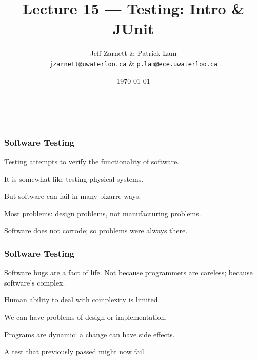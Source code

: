 
\usepackage{alltt}

\title{Lecture 15 --- Testing: Intro \& JUnit}

\author{Jeff Zarnett \& Patrick Lam \\ \small \texttt{jzarnett@uwaterloo.ca} \& \texttt{p.lam@ece.uwaterloo.ca}}
\date{\today}



\begin{frame}
  \titlepage

  \vfill
  \begin{center}
    \\
                  {\tiny\CcNote{\CcLongnameByNcSa}}
                  \vspace*{-2.5ex}
  \end{center}

\end{frame}

\begin{frame}
\frametitle{Software Testing}
\begin{changemargin}{1cm}
\alert{Testing} attempts to verify the functionality of software.

It is somewhat like testing physical systems.

But software can fail in many bizarre ways.

Most problems: design problems, not manufacturing problems.

Software does not corrode; so problems were always there.

\end{changemargin}
\end{frame}


\begin{frame}
\frametitle{Software Testing}
\begin{changemargin}{1cm}
Software bugs are a fact of life. Not because programmers are careless; because software's complex.

Human ability to deal with complexity is limited.

We can have problems of design or implementation.

Programs are dynamic: a change can have side effects.

A test that previously passed might now fail.

\end{changemargin}
\end{frame}

